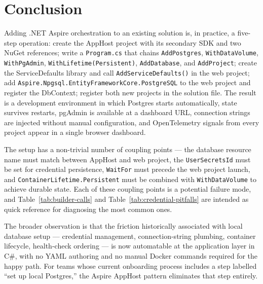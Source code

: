 \section{Conclusion}
\label{sec:conclusion}

Adding .NET Aspire orchestration to an existing solution is, in practice, a five-step operation: create the AppHost project with its secondary SDK and two NuGet references; write a \texttt{Program.cs} that chains \texttt{AddPostgres}, \texttt{WithDataVolume}, \texttt{WithPgAdmin}, \texttt{WithLifetime(Persistent)}, \texttt{AddDatabase}, and \texttt{AddProject}; create the ServiceDefaults library and call \texttt{AddServiceDefaults()} in the web project; add \texttt{Aspire.Npgsql.EntityFrameworkCore.PostgreSQL} to the web project and register the DbContext; register both new projects in the solution file. The result is a development environment in which Postgres starts automatically, state survives restarts, pgAdmin is available at a dashboard URL, connection strings are injected without manual configuration, and OpenTelemetry signals from every project appear in a single browser dashboard.

The setup has a non-trivial number of coupling points --- the database resource name must match between AppHost and web project, the \texttt{UserSecretsId} must be set for credential persistence, \texttt{WaitFor} must precede the web project launch, and \texttt{ContainerLifetime.Persistent} must be combined with \texttt{WithDataVolume} to achieve durable state. Each of these coupling points is a potential failure mode, and Table~\ref{tab:builder-calls} and Table~\ref{tab:credential-pitfalls} are intended as quick reference for diagnosing the most common ones.

The broader observation is that the friction historically associated with local database setup --- credential management, connection-string plumbing, container lifecycle, health-check ordering --- is now automatable at the application layer in C\#, with no YAML authoring and no manual Docker commands required for the happy path. For teams whose current onboarding process includes a step labelled ``set up local Postgres,'' the Aspire AppHost pattern eliminates that step entirely.

